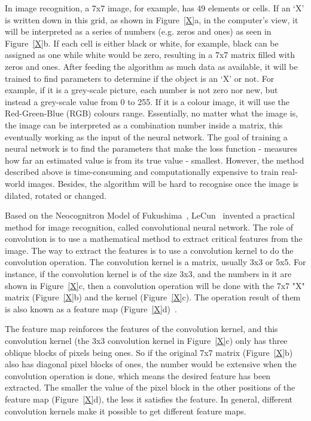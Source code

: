 In image recognition, a 7x7 image, for example, has 49 elements or cells. If an `X' is written down in this grid, as shown in Figure~\ref{X}a, in the computer's view, it will be interpreted as a series of numbers (e.g. zeros and ones) as seen in Figure~\ref{X}b. If each cell is either black or white, for example, black can be assigned as one while white would be zero, resulting in a 7x7 matrix filled with zeros and ones. After feeding the algorithm as much data as available, it will be trained to find parameters to determine if the object is an `X' or not. For example, if it is a grey-scale picture, each number is not zero nor new, but instead a grey-scale value from 0 to 255. If it is a colour image, it will use the Red-Green-Blue (RGB) colours range. Essentially, no matter what the image is, the image can be interpreted as a combination number inside a matrix, this eventually working as the input of the neural network. The goal of training a neural network is to find the parameters that make the loss function - measures how far an estimated value is from its true value - smallest. However, the method described above is time-consuming and computationally expensive to train real-world images. Besides, the algorithm will be hard to recognise once the image is dilated, rotated or changed.


Based on the Neocognitron Model of Fukushima~\cite{fukushima1982neocognitron}, LeCun~\cite{lecun1995convolutional} invented a practical method for image recognition, called convolutional neural network. The role of convolution is to use a mathematical method to extract critical features from the image. The way to extract the features is to use a convolution kernel to do the convolution operation. The convolution kernel is a matrix, usually 3x3 or 5x5. For instance, if the convolution kernel is of the size 3x3, and the numbers in it are shown in Figure~\ref{X}c, then a convolution operation will be done with the 7x7 "X" matrix (Figure~\ref{X}b) and the kernel (Figure~\ref{X}c). The operation result of them is also known as a feature map (Figure~\ref{X}d)~\cite{bouvrie2006notes}.


The feature map reinforces the features of the convolution kernel, and this convolution kernel (the 3x3 convolution kernel in Figure~\ref{X}c) only has three oblique blocks of pixels being ones. So if the original 7x7 matrix (Figure~\ref{X}b) also has diagonal pixel blocks of ones, the number would be extensive when the convolution operation is done, which means the desired feature has been extracted. The smaller the value of the pixel block in the other positions of the feature map (Figure~\ref{X}d), the less it satisfies the feature. In general, different convolution kernels make it possible to get different feature maps.

